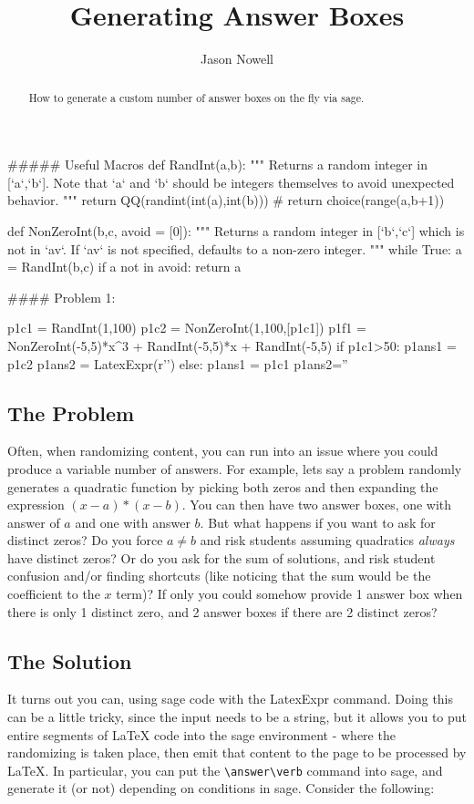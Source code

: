 \documentclass{ximera}
\title{Generating Answer Boxes}
\author{Jason Nowell}
\begin{document}
\begin{abstract}
    How to generate a custom number of answer boxes on the fly via sage.
\end{abstract}
\maketitle


\begin{sagesilent}
##### Useful Macros
def RandInt(a,b):
    """ Returns a random integer in [`a`,`b`]. Note that `a` and `b` should be integers themselves to avoid unexpected behavior.
    """
    return QQ(randint(int(a),int(b)))
    # return choice(range(a,b+1))

def NonZeroInt(b,c, avoid = [0]):
    """ Returns a random integer in [`b`,`c`] which is not in `av`. 
        If `av` is not specified, defaults to a non-zero integer.
    """
    while True:
        a = RandInt(b,c)
        if a not in avoid:
            return a

#### Problem 1:

p1c1 = RandInt(1,100)
p1c2 = NonZeroInt(1,100,[p1c1])
p1f1 = NonZeroInt(-5,5)*x^3 + RandInt(-5,5)*x + RandInt(-5,5)
if p1c1>50:
    p1ans1 = p1c2
    p1ans2 = LatexExpr(r'')
else:
    p1ans1 = p1c1
    p1ans2=''
    



\end{sagesilent}
   
   
\subsection*{The Problem}
     Often, when randomizing content, you can run into an issue where you could produce a variable number of answers. For example, lets say a problem randomly generates a quadratic function by picking both zeros and then expanding the expression $(x-a)*(x-b)$. You can then have two answer boxes, one with answer of $a$ and one with answer $b$. But what happens if you want to ask for distinct zeros? Do you force $a \neq b$ and risk students assuming quadratics \textit{always} have distinct zeros? Or do you ask for the sum of solutions, and risk student confusion and/or finding shortcuts (like noticing that the sum would be the coefficient to the $x$ term)? If only you could somehow provide 1 answer box when there is only 1 distinct zero, and 2 answer boxes if there are 2 distinct zeros?
    
\subsection*{The Solution}
    It turns out you can, using sage code with the LatexExpr command. Doing this can be a little tricky, since the input needs to be a string, but it allows you to put entire segments of LaTeX code into the sage environment - where the randomizing is taken place, then emit that content to the page to be processed by LaTeX. In particular, you can put the \verb|\answer\verb| command into sage, and generate it (or not) depending on conditions in sage. Consider the following:
\end{document}
